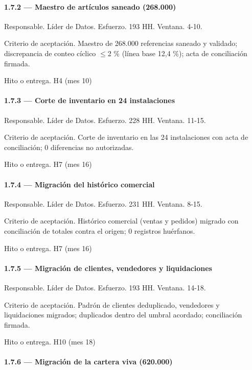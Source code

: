 \documentclass[11pt]{article}
\begin{document}
\paragraph{1.7.2 — Maestro de artículos saneado (268.000)}

Responsable. Líder de Datos. Esfuerzo. 193 HH. Ventana. 4-10.

Criterio de aceptación. Maestro de 268.000 referencias saneado y validado; discrepancia de conteo cíclico \(\leq\)2 \% (línea base 12,4 \%); acta de conciliación firmada.

Hito o entrega. H4 (mes 10)

\paragraph{1.7.3 — Corte de inventario en 24 instalaciones}

Responsable. Líder de Datos. Esfuerzo. 228 HH. Ventana. 11-15.

Criterio de aceptación. Corte de inventario en las 24 instalaciones con acta de conciliación; 0 diferencias no autorizadas.

Hito o entrega. H7 (mes 16)

\paragraph{1.7.4 — Migración del histórico comercial}

Responsable. Líder de Datos. Esfuerzo. 231 HH. Ventana. 8-15.

Criterio de aceptación. Histórico comercial (ventas y pedidos) migrado con conciliación de totales contra el origen; 0 registros huérfanos.

Hito o entrega. H7 (mes 16)

\paragraph{1.7.5 — Migración de clientes, vendedores y liquidaciones}

Responsable. Líder de Datos. Esfuerzo. 193 HH. Ventana. 14-18.

Criterio de aceptación. Padrón de clientes deduplicado, vendedores y liquidaciones migrados; duplicados dentro del umbral acordado; conciliación firmada.

Hito o entrega. H10 (mes 18)

\paragraph{1.7.6 — Migración de la cartera viva (620.000)}
\end{document}
